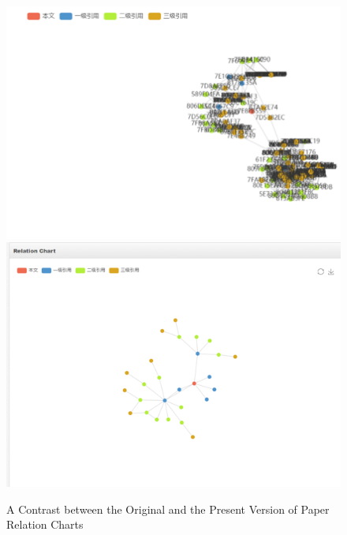 \documentclass{book}
\begin{document}
\begin{figure}[htp]
\centering
\includegraphics[scale=0.55]{img/zlt_rel_demo4.png}
\includegraphics[scale=0.55]{img/zlt_rel_demo5.png}
\caption{A Contrast between the Original and the Present Version of Paper Relation Charts}
\label{fig:rel_contrast}
\end{figure}
\end{document}
